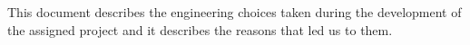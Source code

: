%

This document describes the engineering choices taken during the development of the assigned project and it describes the reasons that led us to them.
